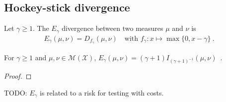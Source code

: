 \subsection{Hockey-stick divergence}

\begin{definition}
  \label{def:eGamma}
  Let $\gamma \ge 1$. The $E_\gamma$ divergence between two measures $\mu$ and $\nu$ is
  \begin{align*}
  E_\gamma(\mu, \nu) = D_{f_\gamma}(\mu, \nu) \quad \text{with } f_\gamma: x \mapsto \max\{0, x - \gamma\} \: .
  \end{align*}
\end{definition}

\begin{lemma}
  \label{lem:eGamma_eq_deGrootInfo}
  For $\gamma \ge 1$ and $\mu, \nu \in \mathcal M(\mathcal X)$, $E_\gamma(\mu, \nu) = (\gamma + 1) I_{(\gamma + 1)^{-1}}(\mu, \nu)$~.
\end{lemma}

\begin{proof}%
\uses{}

\end{proof}

TODO: $E_\gamma$ is related to a risk for testing with costs.